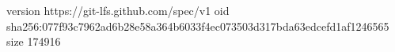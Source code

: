 version https://git-lfs.github.com/spec/v1
oid sha256:077f93c7962ad6b28e58a364b6033f4ec073503d317bda63edcefd1af1246565
size 174916
